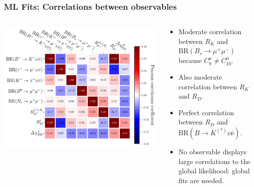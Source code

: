 \documentclass[mathserif, 10pt]{beamer}
\begin{document}
\begin{frame}\frametitle{ML Fits: Correlations between observables}

    \begin{columns}[onlytextwidth]
        \begin{column}{0.6\textwidth}
            \includegraphics[width=\columnwidth]{figures/obscorr.pdf}
        \end{column}
        \begin{column}{0.4\textwidth}
            \begin{itemize}
                \item Moderate correlation between $R_K$ and $\mathrm{BR}(B_s \to \mu^+ \mu^-)$ because $C_9^\mu \neq C_{10}^\mu$.
                \item Also moderate correlation between $R_K$ and $R_D$.
                \item Perfect correlation between $R_D$ and $\mathrm{BR}(B\to K^{(*)}\nu\bar{\nu})$.
                \item No observable displays large correlations to the global likelihood: global fits are needed.
            \end{itemize}
        \end{column}
    \end{columns}

\end{frame}
\end{document}

